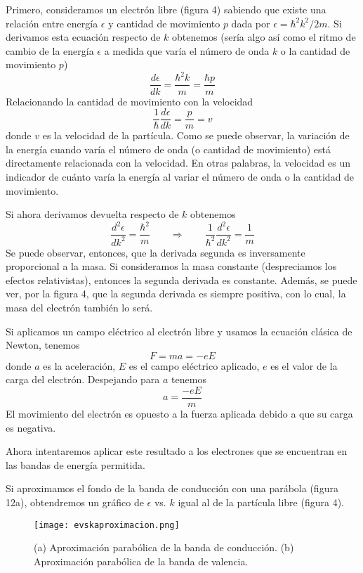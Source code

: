 \documentclass[12pt,a4paper]{article}
\begin{document}
Primero, consideramos un electrón libre (figura 4) sabiendo que existe una relación entre energía $\epsilon$ y cantidad de movimiento $p$ dada por $\epsilon=\hbar^{2}k^{2}/2m$. Si derivamos esta ecuación respecto de $k$ obtenemos (sería algo así como el ritmo de cambio de la energía $\epsilon$ a medida que varía el número de onda $k$ o la cantidad de movimiento $p$)
\[ \frac{d\epsilon}{dk} = \frac{\hbar^{2}k}{m} = \frac{\hbar p}{m} \]
Relacionando la cantidad de movimiento con la velocidad
\[ \frac{1}{\hbar} \frac{d\epsilon}{dk}=\frac{p}{m}=v \]
donde $v$ es la velocidad de la partícula. Como se puede observar, la variación de la energía cuando varía el número de onda (o cantidad de movimiento) está directamente relacionada con la velocidad. En otras palabras, la velocidad es un indicador de cuánto varía la energía al variar el número de onda o la cantidad de movimiento.

Si ahora derivamos devuelta respecto de $k$ obtenemos
\[ \frac{d^{2}\epsilon}{dk^{2}} = \frac{\hbar^{2}}{m} \qquad \Rightarrow \qquad \frac{1}{\hbar^{2}} \frac{d^{2}\epsilon}{dk^{2}} = \frac{1}{m} \]
Se puede observar, entonces, que la derivada segunda es inversamente proporcional a la masa. Si consideramos la masa constante (despreciamos los efectos relativistas), entonces la segunda derivada es constante. Además, se puede ver, por la figura 4, que la segunda derivada es siempre positiva, con lo cual, la masa del electrón también lo será.

Si aplicamos un campo eléctrico al electrón libre y usamos la ecuación clásica de Newton, tenemos
\[ F=ma=-eE \]
donde $a$ es la aceleración, $E$ es el campo eléctrico aplicado, $e$ es el valor de la carga del electrón. Despejando para $a$ tenemos
\[ a= \frac{-eE}{m} \]
El movimiento del electrón es opuesto a la fuerza aplicada debido a que su carga es negativa.

Ahora intentaremos aplicar este resultado a los electrones que se encuentran en las bandas de energía permitida.

Si aproximamos el fondo de la banda de conducción con una parábola (figura 12a), obtendremos un gráfico de $\epsilon$ vs. $k$ igual al de la partícula libre (figura 4).

\begin{figure}[ht!]
\begin{center}
\texttt{[image: evskaproximacion.png]}
\caption{(a) Aproximación parabólica de la banda de conducción. (b) Aproximación parabólica de la banda de valencia.}
\end{center}
\end{figure}
\end{document}
